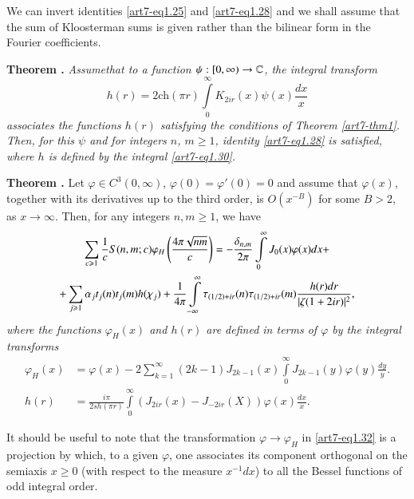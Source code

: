 We can invert identities \eqref{art7-eq1.25} and \eqref{art7-eq1.28} and we shall assume that the sum of Kloosterman sums is given rather than the bilinear form in the Fourier coefficients.

\medskip
\noindent
{\bfseries Theorem .\label{art7-thm3}} \textit{Assume\pageoriginale that to a function $\psi : [0, \infty) \to\mathbb{C}$, the integral transform}
\begin{equation}
h(r) = 2\text{ch} (\pi r) \int\limits^\infty_0 K_{2ir} (x) \psi (x)  \frac{dx}{x} \label{art7-eq1.30}
\end{equation}
\textit{associates the functions $h(r)$ satisfying the conditions of Theorem \ref{art7-thm1}. Then, for this $\psi$ and for integers $n$, $m \geqslant 1$, identity \eqref{art7-eq1.28} is satisfied, where $h$ is defined by the integral \eqref{art7-eq1.30}.}

\medskip
\noindent
{\bfseries Theorem .\label{art7-thm4}}
Let $\varphi \in C^3 (0, \infty)$, $\varphi (0) = \varphi'(0) = 0$ and assume that $\varphi (x)$, together with its derivatives up to the third order, is $O(x^{-B})$ for some $B > 2$, as $x \to \infty$. Then, for any integers $n, m \geqslant 1$, we have
\begin{gather}
\sum\limits_{c \geqslant 1} \frac{1}{c} S (n, m; c) \varphi_H \left(\frac{4\pi \sqrt{nm}}{c} \right) = - \frac{\delta_{n,m}}{2\pi} \int\limits^\infty_0 J_0 (x) \varphi (x) dx +\label{art7-eq1.31}\\
+ \sum\limits_{j \geqslant 1} \alpha_j t_j (n) t_j (m) h (\chi_j) + \frac{1}{4\pi} \int\limits^\infty_{-\infty} \tau_{(1/2) + ir } (n) \tau_{(1/2) + ir} (m) \frac{h(r)dr}{|\zeta (1+2ir)|^2},\notag
\end{gather}
\textit{where the functions $\varphi_H(x)$ and $h(r)$ are defined in terms of $\varphi$ by the integral transforms}
\begin{align}
\varphi_H(x) & = \varphi(x) - 2 \sum\limits^\infty_{k=1} (2k -1) J_{2k -1} (x) \int\limits^\infty_0 J_{2k-1} (y) \varphi (y) \frac{dy}{y}. \label{art7-eq1.32}\\
h(r) & = \frac{i \pi}{2sh (\pi r)} \int\limits^\infty_0 (J_{2 ir} (x) - J_{-2ir} (X)) \varphi (x) \frac{dx}{x}. \label{art7-eq1.33}
\end{align}

It should be useful to note that the transformation $\varphi \to \varphi_H$ in \eqref{art7-eq1.32} is a projection by which, to a given $\varphi$, one associates its component orthogonal on the semiaxis $x \geqslant 0$ (with respect to the measure $x^{-1}dx$) to all the Bessel functions of odd integral order.

